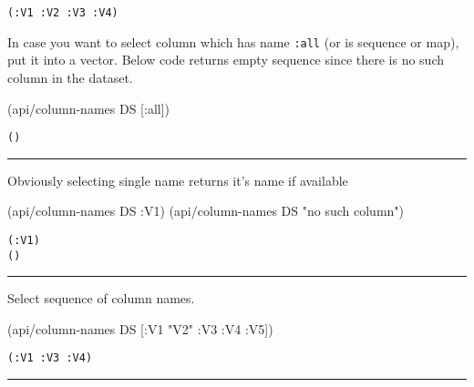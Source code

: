 \documentclass[]{article}
\newenvironment{Shaded}{\begin{snugshade}}{\end{snugshade}}
\newcommand{\StringTok}[1]{\textcolor[rgb]{0.31,0.60,0.02}{#1}}
\newcommand{\AttributeTok}[1]{\textcolor[rgb]{0.77,0.63,0.00}{#1}}
\newcommand{\NormalTok}[1]{#1}
\begin{document}
\begin{verbatim}
(:V1 :V2 :V3 :V4)
\end{verbatim}

In case you want to select column which has name \texttt{:all} (or is
sequence or map), put it into a vector. Below code returns empty
sequence since there is no such column in the dataset.

\begin{Shaded}
\begin{Highlighting}[]
\NormalTok{(api/column-names DS [}\AttributeTok{:all}\NormalTok{])}
\end{Highlighting}
\end{Shaded}

\begin{verbatim}
()
\end{verbatim}

\begin{center}\rule{0.5\linewidth}{0.5pt}\end{center}

Obviously selecting single name returns it's name if available

\begin{Shaded}
\begin{Highlighting}[]
\NormalTok{(api/column-names DS }\AttributeTok{:V1}\NormalTok{)}
\NormalTok{(api/column-names DS }\StringTok{"no such column"}\NormalTok{)}
\end{Highlighting}
\end{Shaded}

\begin{verbatim}
(:V1)
()
\end{verbatim}

\begin{center}\rule{0.5\linewidth}{0.5pt}\end{center}

Select sequence of column names.

\begin{Shaded}
\begin{Highlighting}[]
\NormalTok{(api/column-names DS [}\AttributeTok{:V1} \StringTok{"V2"} \AttributeTok{:V3} \AttributeTok{:V4} \AttributeTok{:V5}\NormalTok{])}
\end{Highlighting}
\end{Shaded}

\begin{verbatim}
(:V1 :V3 :V4)
\end{verbatim}

\begin{center}\rule{0.5\linewidth}{0.5pt}\end{center}
\end{document}
